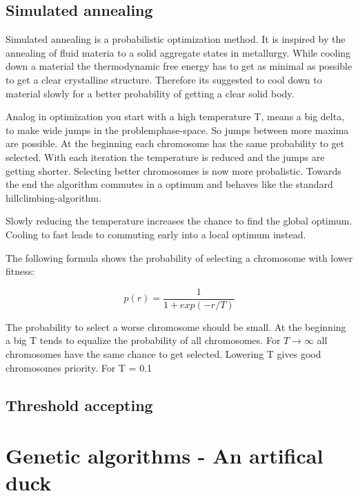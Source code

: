 \documentclass[10pt,a4paper,DIV=11]{scrreprt}
\begin{document}
\subsection{Simulated annealing}
Simulated annealing is a probabilistic optimization method.
It is inspired by the annealing of fluid materia to a solid aggregate states in metallurgy. While cooling down a material the thermodynamic free energy has to get as minimal as possible to get a clear crystalline structure. Therefore its suggested to cool down to material slowly for a better probability of getting a clear solid body.

Analog in optimization you start with a high temperature T, means a big delta, to make wide jumps in the problemphase-space. So jumps between more maxima are possible. At the beginning each chromosome has the same probability to get selected. With each iteration the temperature is reduced and the jumps are getting shorter. Selecting better chromosomes is now more probalistic.
Towards the end the algorithm commutes in a optimum and behaves like the standard hillclimbing-algorithm.

Slowly reducing the temperature increases the chance to find the global optimum. Cooling to fast leads to commuting early into a local optimum instead.

The following formula shows the probability of selecting a chromosome with lower fitness:

\begin{equation}
p(r) = \frac{1}{1+exp(-r/T)}
\end{equation} 

The probability to select a worse chromosome should be small.
At the beginning a big T tends to equalize the probability of all chromosomes. For $T \to \infty$ all chromosomes have the same chance to get selected. Lowering T gives good chromosomes priority. For T = 0.1

\subsection{Threshold accepting}

\section{Genetic algorithms - An artifical duck}

\section{}
\end{document}

